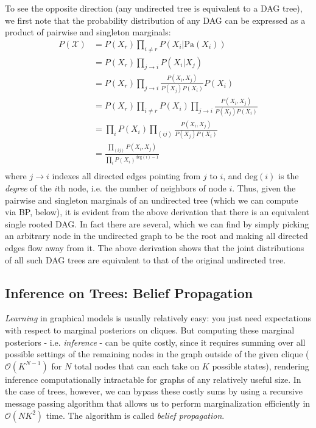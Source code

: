 \documentclass[a4paper]{article}
\begin{document}
To see the opposite direction (any undirected tree is equivalent to a DAG tree), we first note that the probability distribution of any DAG can be expressed as a product of pairwise and singleton marginals:
\begin{align*}
P(\mathcal{X}) &= P(X_r)\prod_{i\neq r} P(X_i|\textrm{Pa}(X_i)) \\
&= P(X_r)\prod_{j\rightarrow i} P(X_i|X_j) \\
&= P(X_r)\prod_{j\rightarrow i} \frac{P(X_i,X_j)}{P(X_j)P(X_i)}P(X_i) \\
&= P(X_r)\prod_{i\neq r}P(X_i) \prod_{j\rightarrow i} \frac{P(X_i,X_j)}{P(X_j)P(X_i)} \\
&= \prod_i P(X_i) \prod_{(ij)} \frac{P(X_i,X_j)}{P(X_j)P(X_i)} \\
&= \frac{\prod_{(ij)} P(X_i,X_j)}{\prod_i P(X_i)^{\textrm{deg}(i)-1}} \\
\end{align*}
where $j\rightarrow i$ indexes all directed edges pointing from $j$ to $i$, and $\textrm{deg}(i)$ is the \emph{degree} of the $i$th node, i.e. the number of neighbors of node $i$. Thus, given the pairwise and singleton marginals of an undirected tree (which we can compute via BP, below), it is evident from the above derivation that there is an equivalent single rooted DAG. In fact there are several, which we can find by simply picking an arbitrary node in the undirected graph to be the root and making all directed edges flow away from it. The above derivation shows that the joint distributions of all such DAG trees are equivalent to that of the original undirected tree.

\subsection{Inference on Trees: Belief Propagation}
\emph{Learning} in graphical models is usually relatively easy: you just need expectations with respect to marginal posteriors on cliques. But computing these marginal posteriors - i.e. \emph{inference} - can be quite costly, since it requires summing over all possible settings of the remaining nodes in the graph outside of the given clique ($\mathcal{O}(K^{N-1})$ for $N$ total nodes that can each take on $K$ possible states), rendering inference computationally intractable for graphs of any relatively useful size. In the case of trees, however, we can bypass these costly sums by using a recursive message passing algorithm that allows us to perform marginalization efficiently in $\mathcal{O}(NK^2)$ time. The algorithm is called \emph{belief propagation}.
\end{document}
